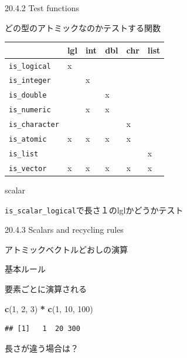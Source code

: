 \documentclass[ignorenonframetext,]{beamer}
\newenvironment{Shaded}{\begin{snugshade}}{\end{snugshade}}
\newcommand{\KeywordTok}[1]{\textcolor[rgb]{0.13,0.29,0.53}{\textbf{#1}}}
\newcommand{\DecValTok}[1]{\textcolor[rgb]{0.00,0.00,0.81}{#1}}
\newcommand{\StringTok}[1]{\textcolor[rgb]{0.31,0.60,0.02}{#1}}
\newcommand{\OperatorTok}[1]{\textcolor[rgb]{0.81,0.36,0.00}{\textbf{#1}}}
\newcommand{\NormalTok}[1]{#1}
\begin{document}
\begin{frame}[fragile]{20.4.2 Test functions}

どの型のアトミックなのかテストする関数

\begin{longtable}[]{@{}llllll@{}}
\toprule
& lgl & int & dbl & chr & list\tabularnewline
\midrule
\endhead
\texttt{is\_logical} & x & & & &\tabularnewline
\texttt{is\_integer} & & x & & &\tabularnewline
\texttt{is\_double} & & & x & &\tabularnewline
\texttt{is\_numeric} & & x & x & &\tabularnewline
\texttt{is\_character} & & & & x &\tabularnewline
\texttt{is\_atomic} & x & x & x & x &\tabularnewline
\texttt{is\_list} & & & & & x\tabularnewline
\texttt{is\_vector} & x & x & x & x & x\tabularnewline
\bottomrule
\end{longtable}

\begin{block}{scalar}

\texttt{is\_scalar\_logical}で長さ１のlglかどうかテスト

\end{block}

\end{frame}

\begin{frame}{20.4.3 Scalars and recycling rules}

アトミックベクトルどおしの演算

\end{frame}

\begin{frame}[fragile]{基本ルール}

要素ごとに演算される

\begin{Shaded}
\begin{Highlighting}[]
\KeywordTok{c}\NormalTok{(}\DecValTok{1}\NormalTok{, }\DecValTok{2}\NormalTok{, }\DecValTok{3}\NormalTok{) }\OperatorTok{*}\StringTok{ }\KeywordTok{c}\NormalTok{(}\DecValTok{1}\NormalTok{, }\DecValTok{10}\NormalTok{, }\DecValTok{100}\NormalTok{)}
\end{Highlighting}
\end{Shaded}

\begin{verbatim}
## [1]   1  20 300
\end{verbatim}

長さが違う場合は？

\end{frame}
\end{document}
